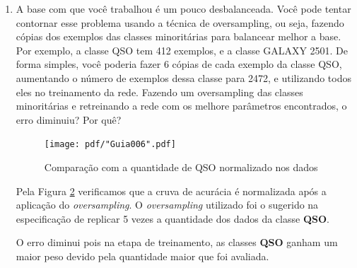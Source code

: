 \begin{enumerate}
    Como os dados são embaralhados na leitura do \textit{dataset}, é possível que a maior os dados da classe \textit{QSO} não estejam na partição de treinamento, ocasionando um erro na avaliação da classe de que não foi treinada.
    
    Se o \textit{overfitting} for causado pela rede, uma possível alternativa é a \textbf{Dropout Regularizattion}\cite{srivastava2014dropout}, em que durante o processo de treinamento, uma certa quantidade de neurônios são selecionados para serem desativados. Assim a rede fica mais robusta e evita o \textit{overfitting} ao mesmo tempo.
    
    A função está disponível na biblioteca padrão do Keras\footnote{\url{https://keras.io/layers/core/#dropout}}.
    
    \begin{figure}[H]
        \centering
        \texttt{[image: pdf/"Guia005".pdf]}
        \caption{Comparação utilizando Dropout Regularization}
        \label{fig:compdropout}
    \end{figure}
    
    Analisando este recurso na Figura \ref{fig:compdropout}, vemos que a acurácia da validação e do teste teve um bom ganho em que muitos casos tem a curva acima do valor de treinamento.
    
    \newpage
    \item A base com que você trabalhou é um pouco desbalanceada. Você pode tentar contornar esse problema usando a técnica de oversampling, ou seja, fazendo cópias dos exemplos das classes minoritárias para balancear melhor a base. Por exemplo, a classe QSO tem 412 exemplos, e a classe GALAXY 2501. De forma simples, você poderia fazer 6 cópias de cada exemplo da classe QSO, aumentando o número de exemplos dessa classe para 2472, e utilizando todos eles no treinamento da rede. Fazendo um oversampling das classes minoritárias e retreinando a rede com os melhore parâmetros encontrados, o erro diminuiu? Por quê?
    
    \begin{figure}[H]
        \centering
        \texttt{[image: pdf/"Guia006".pdf]}
        \caption{Comparação com a quantidade de QSO normalizado nos dados}
        \label{fig:compquantQSO}
    \end{figure}
    
    Pela Figura \ref{fig:compquantQSO} verificamos que a cruva de acurácia é normalizada após a aplicação do \textit{oversampling}.
    O \textit{oversampling} utilizado foi o sugerido na especificação de replicar 5 vezes a quantidade dos dados da classe \textbf{QSO}.
    
    O erro diminui pois na etapa de treinamento, as classes \textbf{QSO} ganham um maior peso devido pela quantidade maior que foi avaliada.
    
    \newpage
\end{enumerate}



